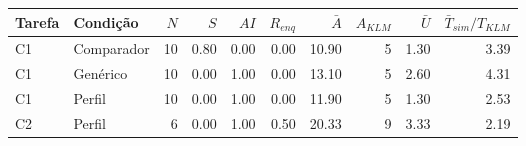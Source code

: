 \begin{tabular}{llrrrrrrrr}
\toprule
Tarefa & Condição & $N$ & $S$ & $AI$ & $R_{enq}$ & $\bar{A}$ & $A_{KLM}$ & $\bar{U}$ & $\bar{T}_{sim}/T_{KLM}$ \\
\midrule
C1 & Comparador & 10 & 0.80 & 0.00 & 0.00 & 10.90 & 5 & 1.30 & 3.39 \\
C1 & Genérico & 10 & 0.00 & 1.00 & 0.00 & 13.10 & 5 & 2.60 & 4.31 \\
C1 & Perfil & 10 & 0.00 & 1.00 & 0.00 & 11.90 & 5 & 1.30 & 2.53 \\
C2 & Perfil & 6 & 0.00 & 1.00 & 0.50 & 20.33 & 9 & 3.33 & 2.19 \\
\bottomrule
\end{tabular}
